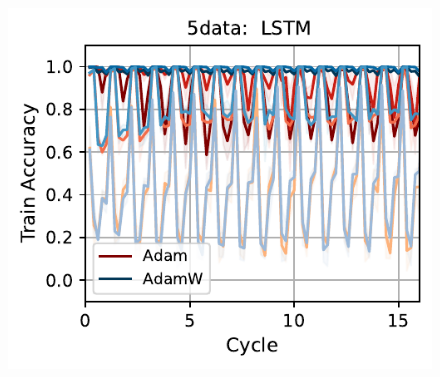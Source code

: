 \begin{figure}[t]
{    \includegraphics[width=\textwidth]{figs/Accuracy/5nlp/lstm/5data_50.pdf}
    }\\
\end{figure}
